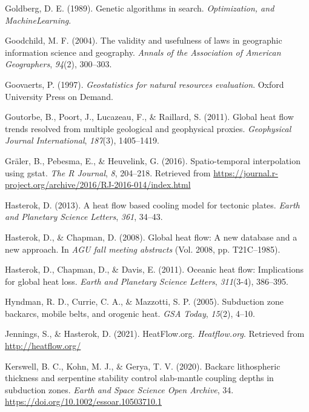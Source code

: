 \documentclass[draft,linenumbers]{agujournal2018}
\begin{document}
\leavevmode{}%
Goldberg, D. E. (1989). Genetic algorithms in search.
\emph{Optimization, and MachineLearning}.

\leavevmode{}%
Goodchild, M. F. (2004). The validity and usefulness of laws in
geographic information science and geography. \emph{Annals of the
Association of American Geographers}, \emph{94}(2), 300--303.

\leavevmode{}%
Goovaerts, P. (1997). \emph{Geostatistics for natural resources
evaluation}. Oxford University Press on Demand.

\leavevmode{}%
Goutorbe, B., Poort, J., Lucazeau, F., \& Raillard, S. (2011). Global
heat flow trends resolved from multiple geological and geophysical
proxies. \emph{Geophysical Journal International}, \emph{187}(3),
1405--1419.

\leavevmode{}%
Gräler, B., Pebesma, E., \& Heuvelink, G. (2016). Spatio-temporal
interpolation using gstat. \emph{The R Journal}, \emph{8}, 204--218.
Retrieved from
\url{https://journal.r-project.org/archive/2016/RJ-2016-014/index.html}

\leavevmode{}%
Hasterok, D. (2013). A heat flow based cooling model for tectonic
plates. \emph{Earth and Planetary Science Letters}, \emph{361}, 34--43.

\leavevmode{}%
Hasterok, D., \& Chapman, D. (2008). Global heat flow: A new database
and a new approach. In \emph{AGU fall meeting abstracts} (Vol. 2008, pp.
T21C--1985).

\leavevmode{}%
Hasterok, D., Chapman, D., \& Davis, E. (2011). Oceanic heat flow:
Implications for global heat loss. \emph{Earth and Planetary Science
Letters}, \emph{311}(3-4), 386--395.

\leavevmode{}%
Hyndman, R. D., Currie, C. A., \& Mazzotti, S. P. (2005). Subduction
zone backarcs, mobile belts, and orogenic heat. \emph{GSA Today},
\emph{15}(2), 4--10.

\leavevmode{}%
Jennings, S., \& Hasterok, D. (2021). HeatFlow.org. \emph{Heatflow.org}.
Retrieved from \url{http://heatflow.org/}

\leavevmode{}%
Kerswell, B. C., Kohn, M. J., \& Gerya, T. V. (2020). Backarc
lithospheric thickness and serpentine stability control slab-mantle
coupling depths in subduction zones. \emph{Earth and Space Science Open
Archive}, 34. \url{https://doi.org/10.1002/essoar.10503710.1}
\end{document}
